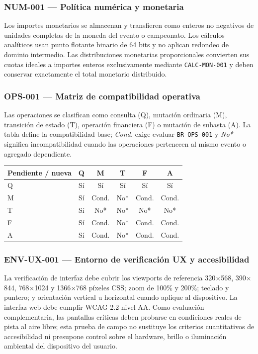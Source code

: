 \documentclass[10pt,letterpaper]{article}
\begin{document}
\subsubsection{NUM-001 --- Política numérica y monetaria}
Los importes monetarios se almacenan y transfieren como enteros no negativos de unidades completas de la moneda del evento o campeonato. Los cálculos analíticos usan punto flotante binario de 64 bits y no aplican redondeo de dominio intermedio. Las distribuciones monetarias proporcionales convierten sus cuotas ideales a importes enteros exclusivamente mediante \texttt{CALC-MON-001} y deben conservar exactamente el total monetario distribuido.

\subsubsection{OPS-001 --- Matriz de compatibilidad operativa}
Las operaciones se clasifican como consulta (Q), mutación ordinaria (M), transición de estado (T), operación financiera (F) o mutación de subasta (A). La tabla define la compatibilidad base; \emph{Cond.} exige evaluar \texttt{BR-OPS-001} y \emph{No*} significa incompatibilidad cuando las operaciones pertenecen al mismo evento o agregado dependiente.
\begin{center}
\begin{tabular}{lccccc}
\toprule
\textbf{Pendiente / nueva} & Q & M & T & F & A\\
\midrule
Q & Sí & Sí & Sí & Sí & Sí\\
M & Sí & Cond. & No* & Cond. & Cond.\\
T & Sí & No* & No* & No* & No*\\
F & Sí & Cond. & No* & Cond. & Cond.\\
A & Sí & Cond. & No* & Cond. & Cond.\\
\bottomrule
\end{tabular}
\end{center}

\subsubsection{ENV-UX-001 --- Entorno de verificación UX y accesibilidad}
La verificación de interfaz debe cubrir los viewports de referencia 320$\times$568, 390$\times$844, 768$\times$1024 y 1366$\times$768 píxeles CSS; zoom de 100\% y 200\%; teclado y puntero; y orientación vertical u horizontal cuando aplique al dispositivo. La interfaz web debe cumplir WCAG 2.2 nivel AA. Como evaluación complementaria, las pantallas críticas deben probarse en condiciones reales de pista al aire libre; esta prueba de campo no sustituye los criterios cuantitativos de accesibilidad ni presupone control sobre el hardware, brillo o iluminación ambiental del dispositivo del usuario.
\end{document}
